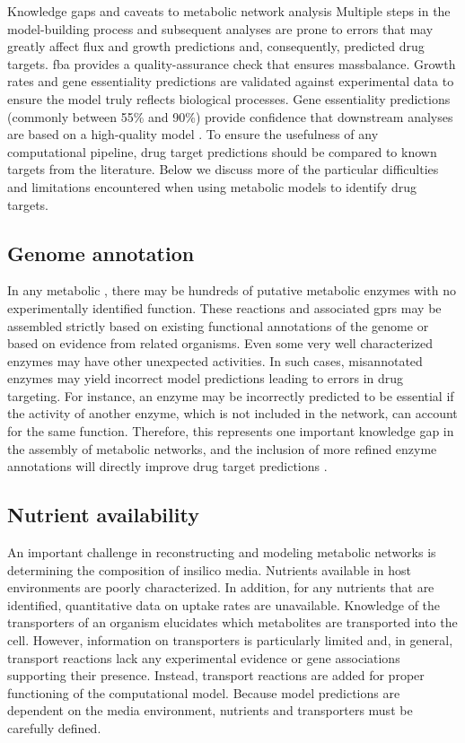 \begin{pabox}[label=trends:box:caveats]{Knowledge gaps and caveats to metabolic network analysis}
Multiple steps in the model-building process and subsequent 
analyses are prone to errors that may greatly affect \gls{flux} 
and growth predictions and, consequently, predicted drug 
targets. \gls{fba} provides a quality-assurance check that ensures 
\gls{massbalance}. Growth rates and gene essentiality predictions 
are validated against experimental data to ensure the 
model truly reflects biological processes. Gene essentiality 
predictions (commonly between 55\% and 90\%) provide 
confidence that downstream analyses are based on a 
high-quality model \cite{Feist:2007dq,Jamshidi:2007ei}. To ensure the usefulness of 
any computational pipeline, drug target predictions 
should be compared to known targets from the literature. 
Below we discuss more of the particular difficulties and 
limitations encountered when using metabolic models to 
identify drug targets.

\subsection*{Genome annotation}
In any metabolic , there may be 
hundreds of putative metabolic enzymes with no 
experimentally identified function. These reactions 
and associated \glspl{gpr} may be assembled 
strictly based on existing functional annotations 
of the genome or based on evidence from related 
organisms. Even some very well characterized enzymes 
may have other unexpected activities. In such cases, 
misannotated enzymes may yield incorrect model 
predictions leading to errors in drug targeting. For 
instance, an enzyme may be incorrectly predicted to be 
essential if the activity of another enzyme, which is 
not included in the network, can account for the same function. 
Therefore, this represents one important knowledge gap in 
the assembly of metabolic networks, and the inclusion of 
more refined enzyme annotations will directly improve 
drug target predictions \cite{Hsiao:2010bu,Szappanos:2011gu}.

\subsection*{Nutrient availability}
An important challenge in reconstructing and modeling 
metabolic networks is determining the composition of 
\gls{insilico} media. Nutrients available in host environments 
are poorly characterized. In addition, for any nutrients 
that are identified, quantitative data on uptake rates 
are unavailable. Knowledge of the transporters of an 
organism elucidates which metabolites are transported 
into the cell. However, information on transporters 
is particularly limited and, in general, transport 
reactions lack any experimental evidence or gene 
associations supporting their presence. Instead, 
transport reactions are added for proper functioning 
of the computational model. Because model predictions are 
dependent on the media environment, nutrients and 
transporters must be carefully defined.


\end{pabox}

